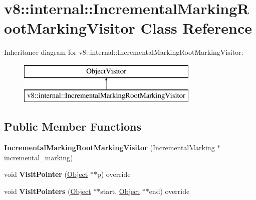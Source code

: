 \hypertarget{classv8_1_1internal_1_1_incremental_marking_root_marking_visitor}{}\section{v8\+:\+:internal\+:\+:Incremental\+Marking\+Root\+Marking\+Visitor Class Reference}
\label{classv8_1_1internal_1_1_incremental_marking_root_marking_visitor}
Inheritance diagram for v8\+:\+:internal\+:\+:Incremental\+Marking\+Root\+Marking\+Visitor\+:\begin{figure}[H]
\begin{center}
\leavevmode
\includegraphics[height=2.000000cm]{classv8_1_1internal_1_1_incremental_marking_root_marking_visitor}
\end{center}
\end{figure}
\subsection*{Public Member Functions}
\begin{DoxyCompactItemize}
\item 
{\bfseries Incremental\+Marking\+Root\+Marking\+Visitor} (\hyperlink{classv8_1_1internal_1_1_incremental_marking}{Incremental\+Marking} $\ast$incremental\+\_\+marking)\hypertarget{classv8_1_1internal_1_1_incremental_marking_root_marking_visitor_a5ff6cdf642190e114e91dbd4050ff5a9}{}\label{classv8_1_1internal_1_1_incremental_marking_root_marking_visitor_a5ff6cdf642190e114e91dbd4050ff5a9}

\item 
void {\bfseries Visit\+Pointer} (\hyperlink{classv8_1_1internal_1_1_object}{Object} $\ast$$\ast$p) override\hypertarget{classv8_1_1internal_1_1_incremental_marking_root_marking_visitor_acab237b9348e1649b4729208bd8bb213}{}\label{classv8_1_1internal_1_1_incremental_marking_root_marking_visitor_acab237b9348e1649b4729208bd8bb213}

\item 
void {\bfseries Visit\+Pointers} (\hyperlink{classv8_1_1internal_1_1_object}{Object} $\ast$$\ast$start, \hyperlink{classv8_1_1internal_1_1_object}{Object} $\ast$$\ast$end) override\hypertarget{classv8_1_1internal_1_1_incremental_marking_root_marking_visitor_af7775a27bf7e1252b0e622f3553000a2}{}\label{classv8_1_1internal_1_1_incremental_marking_root_marking_visitor_af7775a27bf7e1252b0e622f3553000a2}

\end{DoxyCompactItemize}
